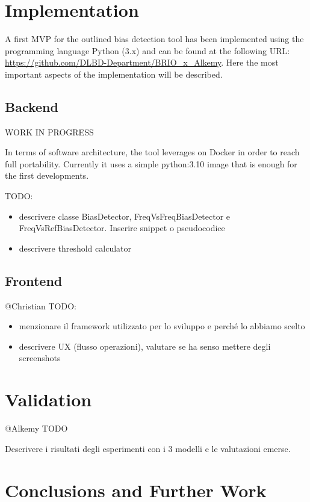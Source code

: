 \documentclass[
]{ceurart}
\begin{document}
\section{Implementation}
\label{sec:implementation}

A first MVP for the outlined bias detection tool has been implemented using the programming language Python (3.x) and can be found at the following URL: \url{https://github.com/DLBD-Department/BRIO_x_Alkemy}. Here the most important aspects of the implementation will be described.

\subsection{Backend}
\label{subsec:backend}
WORK IN PROGRESS

In terms of software architecture, the tool leverages on Docker in order to reach full portability. Currently it uses a simple python:3.10 image that is enough for the first developments. 

TODO:
\begin{itemize}
  \item descrivere classe BiasDetector, FreqVsFreqBiasDetector e FreqVsRefBiasDetector. Inserire snippet o pseudocodice
  \item descrivere threshold calculator
\end{itemize}

\subsection{Frontend}
@Christian
TODO:
\begin{itemize}
  \item menzionare il framework utilizzato per lo sviluppo e perché lo abbiamo scelto
  \item descrivere UX (flusso operazioni), valutare se ha senso mettere degli screenshots
\end{itemize}

\section{Validation}
\label{sec:validation}

@Alkemy TODO

Descrivere i risultati degli esperimenti con i 3 modelli e le valutazioni emerse. 


\section{Conclusions and Further Work}
\label{sec:conclusions}
\end{document}
